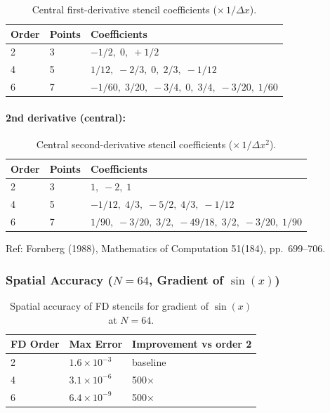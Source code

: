 \begin{table}[htbp]
\centering
\caption{Central first-derivative stencil coefficients ($\times\, 1/\Delta x$).}
\label{tab:grad-stencils}
\begin{tabular}{@{}lll@{}}
\toprule
Order & Points & Coefficients \\
\midrule
2 & 3 & $-1/2,\; 0,\; +1/2$ \\
4 & 5 & $1/12,\; -2/3,\; 0,\; 2/3,\; -1/12$ \\
6 & 7 & $-1/60,\; 3/20,\; -3/4,\; 0,\; 3/4,\; -3/20,\; 1/60$ \\
\bottomrule
\end{tabular}
\end{table}

\paragraph{2nd derivative (central):}
\label{par:lapl-stencils}

\begin{table}[htbp]
\centering
\caption{Central second-derivative stencil coefficients ($\times\, 1/\Delta x^2$).}
\label{tab:lapl-stencils}
\begin{tabular}{@{}lll@{}}
\toprule
Order & Points & Coefficients \\
\midrule
2 & 3 & $1,\; -2,\; 1$ \\
4 & 5 & $-1/12,\; 4/3,\; -5/2,\; 4/3,\; -1/12$ \\
6 & 7 & $1/90,\; -3/20,\; 3/2,\; -49/18,\; 3/2,\; -3/20,\; 1/90$ \\
\bottomrule
\end{tabular}
\end{table}

Ref: Fornberg (1988), Mathematics of Computation 51(184), pp.\ 699--706.

\subsubsection{Spatial Accuracy ($N=64$, Gradient of $\sin(x)$)}
\label{sec:spatial-accuracy}

\begin{table}[htbp]
\centering
\caption{Spatial accuracy of FD stencils for gradient of $\sin(x)$ at $N=64$.}
\label{tab:spatial-accuracy}
\begin{tabular}{@{}lll@{}}
\toprule
FD Order & Max Error & Improvement vs order 2 \\
\midrule
2 & $1.6 \times 10^{-3}$ & baseline \\
4 & $3.1 \times 10^{-6}$ & 500$\times$ \\
6 & $6.4 \times 10^{-9}$ & 500$\times$ \\
\bottomrule
\end{tabular}
\end{table}

